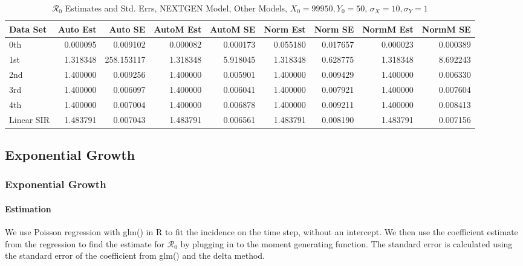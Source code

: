 \documentclass[12pt]{article}
\newcommand{\rr}{\ensuremath{\mathcal{R}_0}}
\begin{document}
\begin{table}[H]
	
	\caption{$\rr$ Estimates and Std. Errs, NEXTGEN Model,
		Other Models, $X_0 = 99950, Y_0 = 50$, 
		$\sigma_X = 10, \sigma_Y = 1$}
	\begin{footnotesize}
		\hskip -1cm
		\begin{tabular}{l|r|r|r|r|r|r|r|r}
			\hline
			Data Set & Auto Est & Auto SE & AutoM Est & AutoM SE & Norm Est & Norm SE & NormM Est & NormM SE\\
			\hline
			0th & 0.000095 & 0.009102 & 0.000082 & 0.000173 & 0.055180 & 0.017657 & 0.000023 & 0.000389\\
			\hline
			1st & 1.318348 & 258.153117 & 1.318348 & 5.918045 & 1.318348 & 0.628775 & 1.318348 & 8.692243\\
			\hline
			2nd & 1.400000 & 0.009256 & 1.400000 & 0.005901 & 1.400000 & 0.009429 & 1.400000 & 0.006330\\
			\hline
			3rd & 1.400000 & 0.006097 & 1.400000 & 0.006041 & 1.400000 & 0.007921 & 1.400000 & 0.007604\\
			\hline
			4th & 1.400000 & 0.007004 & 1.400000 & 0.006878 & 1.400000 & 0.009211 & 1.400000 & 0.008413\\
			\hline
			Linear SIR & 1.483791 & 0.007043 & 1.483791 & 0.006561 & 1.483791 & 0.008190 & 1.483791 & 0.007156\\
			\hline
		\end{tabular}
	\end{footnotesize}
\end{table}

\subsection{Exponential Growth}

\subsubsection{Exponential Growth}

\paragraph{Estimation}

We use Poisson regression with glm() in R to fit the incidence on the time step, without an intercept. We then use the coefficient estimate from the regression to find the estimate for $\rr$ by plugging in to the moment generating function. The standard error is calculated using the standard error of the coefficient from glm() and the delta method.
\end{document}
